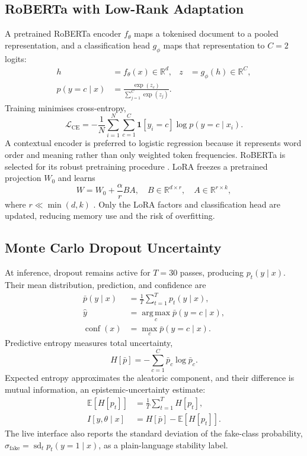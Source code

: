 \documentclass[10pt,twocolumn,letterpaper]{article}
\begin{document}
\subsection{RoBERTa with Low-Rank Adaptation}
A pretrained RoBERTa encoder $f_{\theta}$ maps a tokenised document to a pooled
representation, and a classification head $g_{\phi}$ maps that representation to
$C=2$ logits:
\begin{align}
  h &= f_{\theta}(x)\in\mathbb{R}^{d}, &
  z &= g_{\phi}(h)\in\mathbb{R}^{C}, \\
  p(y=c\mid x) &= \frac{\exp(z_c)}{\sum_{j=1}^{C}\exp(z_j)}.
\end{align}
Training minimises cross-entropy,
\begin{equation}
  \mathcal{L}_{\mathrm{CE}}=-\frac{1}{N}\sum_{i=1}^{N}\sum_{c=1}^{C}
  \mathbf{1}[y_i=c]\log p(y=c\mid x_i).
\end{equation}
A contextual encoder is preferred to logistic regression because it represents
word order and meaning rather than only weighted token frequencies. RoBERTa is
selected for its robust pretraining procedure \cite{liu2019roberta}. LoRA freezes
a pretrained projection $W_0$ and learns
\begin{equation}
  W=W_0+\frac{\alpha}{r}BA, \quad
  B\in\mathbb{R}^{d\times r},\quad A\in\mathbb{R}^{r\times k},
\end{equation}
where $r\ll\min(d,k)$ \cite{hu2022lora}. Only the LoRA factors and classification
head are updated, reducing memory use and the risk of overfitting.

\subsection{Monte Carlo Dropout Uncertainty}
At inference, dropout remains active for $T=30$ passes, producing
$p_t(y\mid x)$. Their mean distribution, prediction, and confidence are
\begin{align}
  \bar p(y\mid x) &= \frac{1}{T}\sum_{t=1}^{T}p_t(y\mid x), \\
  \hat y &= \operatorname*{arg\,max}_{c}\bar p(y=c\mid x), \\
  \operatorname{conf}(x) &= \max_c \bar p(y=c\mid x).
\end{align}
Predictive entropy measures total uncertainty,
\begin{equation}
  H[\bar p]=-\sum_{c=1}^{C}\bar p_c\log\bar p_c.
\end{equation}
Expected entropy approximates the aleatoric component, and their difference is
mutual information, an epistemic-uncertainty estimate:
\begin{align}
  \mathbb{E}[H[p_t]] &= \frac{1}{T}\sum_{t=1}^{T}H[p_t], \\
  I[y,\theta\mid x] &= H[\bar p]-\mathbb{E}[H[p_t]].
\end{align}
The live interface also reports the standard deviation of the fake-class
probability, $\sigma_{\mathrm{fake}}=\operatorname{sd}_t p_t(y=1\mid x)$, as a
plain-language stability label.
\end{document}
